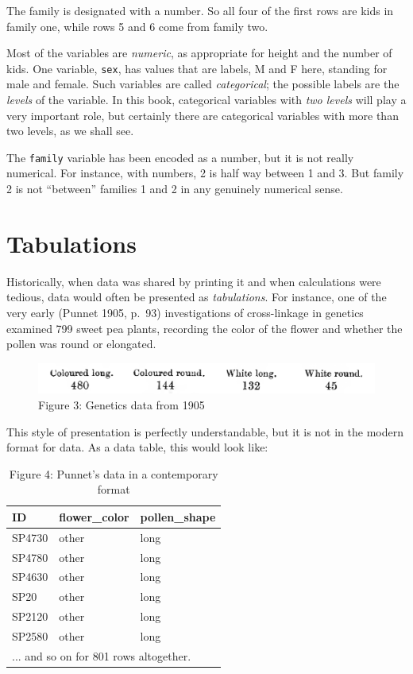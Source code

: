 \documentclass[]{book}
\begin{document}
The family is designated with a number. So all four of the first rows are kids in family one, while rows 5 and 6 come from family two.

Most of the variables are \emph{numeric}, as appropriate for height and the number of kids. One variable, \texttt{sex}, has values that are labels, M and F here, standing for male and female. Such variables are called \emph{categorical}; the possible labels are the \emph{levels} of the variable. In this book, categorical variables with \emph{two levels} will play a very important role, but certainly there are categorical variables with more than two levels, as we shall see.

The \texttt{family} variable has been encoded as a number, but it is not really numerical. For instance, with numbers, 2 is half way between 1 and 3. But family 2 is not ``between'' families 1 and 2 in any genuinely numerical sense.

\hypertarget{tabulations}{%
\section{Tabulations}\label{tabulations}}

Historically, when data was shared by printing it and when calculations were tedious, data would often be presented as \emph{tabulations}. For instance, one of the very early (Punnet 1905, p.~93) investigations of cross-linkage in genetics examined 799 sweet pea plants, recording the color of the flower and whether the pollen was round or elongated.

\begin{figure}\includegraphics[width=0.8\linewidth]{images/Punnet-page-93} \caption{Figure 3: Genetics data from 1905}\label{fig:punnett-93}
\end{figure}

This style of presentation is perfectly understandable, but it is not in the modern format for data. As a data table, this would look like:

\begin{table}[t]

\caption{\label{tab:punnet-raw}Figure 4: Punnet's data in a contemporary format}
\centering
\begin{tabular}{l|l|l}
\hline
ID & flower\_color & pollen\_shape\\
\hline
SP4730 & other & long\\
\hline
SP4780 & other & long\\
\hline
SP4630 & other & long\\
\hline
SP20 & other & long\\
\hline
SP2120 & other & long\\
\hline
SP2580 & other & long\\
\hline
\multicolumn{3}{l}{... and so on for 801 rows altogether.}\\
\end{tabular}
\end{table}
\end{document}
